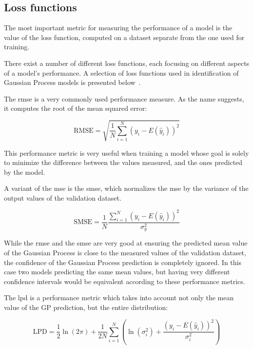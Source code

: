 \subsection{Loss functions}

The most important metric for measuring the performance of a model is the value
of the loss function, computed on a dataset separate from the one used for
training.

There exist a number of different loss functions, each focusing on different
aspects of a model's performance. A selection of loss functions used in
identification of Gaussian Process models is presented
below~\cite{kocijanModellingControlDynamic2016}.

The \acrfull{rmse} is a very commonly used performance measure. As the name
suggests, it computes the root of the mean squared error:

\begin{equation}\label{eq:rmse}
    \text{RMSE} = \sqrt{\frac{1}{N}\sum_{i=1}^N \left(y_i -
    E(\hat{y}_i)\right)^{2}}
\end{equation}

This performance metric is very useful when training a model whose goal is
solely to minimize the difference between the values measured, and the ones
predicted by the model.

A variant of the \acrshort{mse} is the \acrfull{smse}, which normalizes the
\acrlong{mse} by the variance of the output values of the validation dataset.

\begin{equation}\label{eq:smse}
    \text{SMSE} = \frac{1}{N}\frac{\sum_{i=1}^N \left(y_i -
    E(\hat{y}_i)\right)^{2}}{\sigma_y^2}
\end{equation}

While the \acrshort{rmse} and the \acrshort{smse} are very good at ensuring the
predicted mean value of the Gaussian Process is close to the measured values of
the validation dataset, the confidence of the Gaussian Process prediction is
completely ignored. In this case two models predicting the same mean values, but
having very different confidence intervals would be equivalent according to these
performance metrics.

The \acrfull{lpd} is a performance metric which takes into account not only the
mean value of the GP prediction, but the entire distribution:

\begin{equation}
    \text{LPD} = \frac{1}{2} \ln{\left(2\pi\right)} + \frac{1}{2N}
    \sum_{i=1}^N\left(\ln{\left(\sigma_i^2\right)} + \frac{\left(y_i -
    E(\hat{y}_i)\right)^{2}}{\sigma_i^2}\right)
\end{equation}

